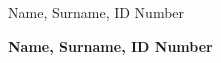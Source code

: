 \documentclass
[twoside,english,colorbacktitle,accentcolor=tud9c]
{tudexercise}
\newcommand{\studentdata}{}
\begin{document}
	
	\hwtitle{}
	\maketitle
	
	\begin{examheader}
		\normalsize
		\vspace{-1em}
		Name, Surname, ID Number \hfill \studentdata{}
		\vspace{-1em}
	\end{examheader} 
	
	\textbf{Name, Surname, ID Number \hfill \studentdata{}}
	
	
	
	
	
	
	
\end{document}
